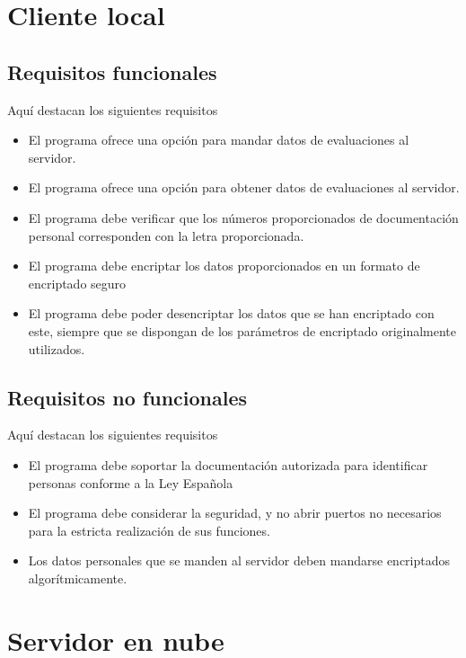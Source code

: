 \documentclass[12pt,a4paper,twoside,openright]{book}
\begin{document}
\section{Cliente local}

\subsection{Requisitos funcionales}

Aquí destacan los siguientes requisitos

\begin{itemize}
  \item [RF2] El programa ofrece una opción para mandar datos de evaluaciones al servidor.
  \item [RF3] El programa ofrece una opción para obtener datos de evaluaciones al servidor.
  \item [RF4] El programa debe verificar que los números proporcionados de documentación personal corresponden con la letra proporcionada.
  \item [RF5] El programa debe encriptar los datos proporcionados en un formato de encriptado seguro
  \item [RF6] El programa debe poder desencriptar los datos que se han encriptado con este, siempre que se dispongan de los parámetros de encriptado originalmente utilizados.
\end{itemize}

\subsection{Requisitos no funcionales}

Aquí destacan los siguientes requisitos

\begin{itemize}
  \item [RNF1] El programa debe soportar la documentación autorizada para identificar personas conforme a la Ley Española
  \item [RNF2] El programa debe considerar la seguridad, y no abrir puertos no necesarios para la estricta realización de sus funciones.
  \item [RNF3] Los datos personales que se manden al servidor deben mandarse encriptados algorítmicamente.
\end{itemize}

\section{Servidor en nube}
\end{document}
